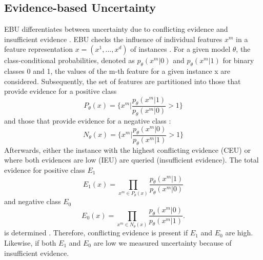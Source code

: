 \subsection{Evidence-based Uncertainty} 
\label{subsec:evidence_based_uncertainty}

\Ac{EBU} differentiates between uncertainty due to conflicting evidence and insufficient evidence \cite{nguyen2021howtomeasure}.
\ac{EBU} checks the influence of individual features $x^m$ in a feature representation 
$x = (x^1,..., x^d)$ of instances \cite{nguyen2021howtomeasure}.
For a given model $\theta$, the class-conditional probabilities, denoted as $p_{\theta}(x^m |0)$ and $p_{\theta}(x^m | 1)$ for binary classes 0 and 1, the values of the m-th feature for a given instance x are considered.
Subsequently, the set of features are partitioned into those that provide evidence for a positive class
\begin{equation}
    P_{\theta}(x) = \bigg\{ x^m \bigg| \frac{p_{\theta}(x^m|1)}{p_{\theta}(x^m|0)} > 1 \bigg\} 
\end{equation}
and those that provide evidence for a negative class \cite{nguyen2021howtomeasure}:
 \begin{equation}
    N_{\theta}(x) = \bigg\{ x^m \bigg| \frac{p_{\theta}(x^m|0)}{p_{\theta}(x^m|1)} > 1 \bigg\} 
\end{equation}
Afterwards, either the instance with the highest conflicting evidence (\ac{CEU}) or where both evidences are low (\ac{IEU}) are queried (insufficient evidence).
The total evidence for positive class $E_1$ 
\begin{equation}
    E_1(x) = \prod\limits_{x^m \in P_{\theta}(x)} \frac{p_{\theta}(x^m|1)}{p_{\theta}(x^m|0)}
\end{equation}
and negative class $E_0$
\begin{equation}
    E_0(x) = \prod\limits_{x^m \in N_{\theta}(x)} \frac{p_{\theta}(x^m|0)}{p_{\theta}(x^m|1)}.
\end{equation} 
is determined \cite{nguyen2021howtomeasure}.
Therefore, conflicting evidence is present if $E_1$ and $E_0$ are high.
Likewise, if both $E_1$ and $E_0$ are low we measured uncertainty because of insufficient evidence.
